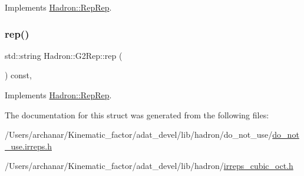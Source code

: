 Implements \mbox{\hyperlink{structHadron_1_1RepRep_ab3213025f6de249f7095892109575fde}{Hadron\+::\+Rep\+Rep}}.

\mbox{\label{structHadron_1_1G2Rep_aa186588eb9d24c8e3ecad3496a16225a}} 
\subsubsection{\texorpdfstring{rep()}{rep()}\hspace{0.1cm}{\footnotesize\ttfamily [3/3]}}
{\footnotesize\ttfamily std\+::string Hadron\+::\+G2\+Rep\+::rep (\begin{DoxyParamCaption}{ }\end{DoxyParamCaption}) const\hspace{0.3cm}{\ttfamily [inline]}, {\ttfamily [virtual]}}



Implements \mbox{\hyperlink{structHadron_1_1RepRep_ab3213025f6de249f7095892109575fde}{Hadron\+::\+Rep\+Rep}}.



The documentation for this struct was generated from the following files\+:\begin{DoxyCompactItemize}
\item 
/\+Users/archanar/\+Kinematic\+\_\+factor/adat\+\_\+devel/lib/hadron/do\+\_\+not\+\_\+use/\mbox{\hyperlink{do__not__use_8irreps_8h}{do\+\_\+not\+\_\+use.\+irreps.\+h}}\item 
/\+Users/archanar/\+Kinematic\+\_\+factor/adat\+\_\+devel/lib/hadron/\mbox{\hyperlink{lib_2hadron_2irreps__cubic__oct_8h}{irreps\+\_\+cubic\+\_\+oct.\+h}}\end{DoxyCompactItemize}

